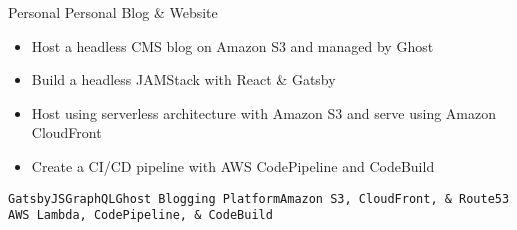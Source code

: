 \documentclass[9pt]{resume} %
\begin{document}
\begin{minipage}[t]{1\textwidth}
\begin{entrylist}{Personal}
		\entry
			{Personal Blog \& Website}
			{}
		{{\begin{itemize}[noitemsep,topsep=0pt,leftmargin=*]
			\item Host a headless CMS blog on Amazon S3 and managed by Ghost
			\item Build a headless JAMStack with React \& Gatsby
			\item Host using serverless architecture with Amazon S3 and serve using Amazon CloudFront
		  	\item Create a CI/CD pipeline with AWS CodePipeline and CodeBuild
		\end{itemize}}						
			{\addtolength{\leftskip}{3mm}\texttt{GatsbyJS}\slashsep\texttt{GraphQL}\slashsep\texttt{Ghost Blogging Platform}\slashsep\texttt{Amazon S3, CloudFront, \& Route53 }\slashsep\texttt{AWS Lambda, CodePipeline, \& CodeBuild}\par}}

							
	\end{entrylist}		
\end{minipage}




\end{document}
